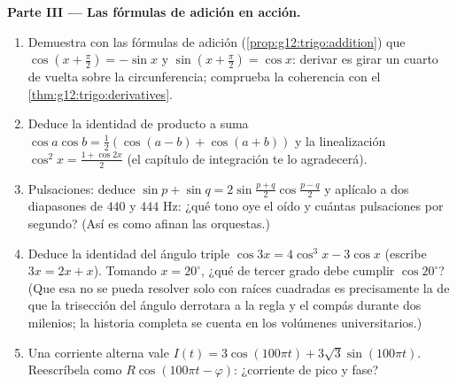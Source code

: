 \begin{problem}
\medskip
\noindent\textbf{Parte III --- Las fórmulas de adición en acción.}
\begin{enumerate}[resume]
  \item Demuestra con las fórmulas de adición
        (\cref{prop:g12:trigo:addition}) que
        $\cos\left(x + \frac\pi2\right) = -\sin x$ y
        $\sin\left(x + \frac\pi2\right) = \cos x$: derivar es girar un
        cuarto de vuelta sobre la circunferencia; comprueba la coherencia
        con el \cref{thm:g12:trigo:derivatives}.
  \item Deduce la identidad de producto a suma
        $\cos a \cos b = \frac12\left(\cos(a - b) + \cos(a + b)\right)$ y
        la linealización $\cos^2 x = \frac{1 + \cos 2x}{2}$ (el capítulo de
        integración te lo agradecerá).
  \item Pulsaciones: deduce
        $\sin p + \sin q = 2 \sin\frac{p + q}{2}\cos\frac{p - q}{2}$ y
        aplícalo a dos diapasones de $440$ y $444$ Hz: ¿qué tono oye el
        oído y cuántas pulsaciones por segundo? (Así es como afinan las
        orquestas.)
  \item Deduce la identidad del ángulo triple
        $\cos 3x = 4\cos^3 x - 3\cos x$ (escribe $3x = 2x + x$). Tomando
        $x = 20^\circ$, ¿qué  de tercer grado debe cumplir
        $\cos 20^\circ$? (Que esa  no se pueda resolver solo con
        raíces cuadradas es precisamente la  de que la trisección del
        ángulo derrotara a la regla y el compás durante dos milenios; la
        historia completa se cuenta en los volúmenes universitarios.)
  \item Una corriente alterna vale
        $I(t) = 3\cos(100\pi t) + 3\sqrt3 \sin(100\pi t)$. Reescríbela como
        $R\cos(100\pi t - \varphi)$: ¿corriente de pico y fase?
\end{enumerate}


\end{problem}
